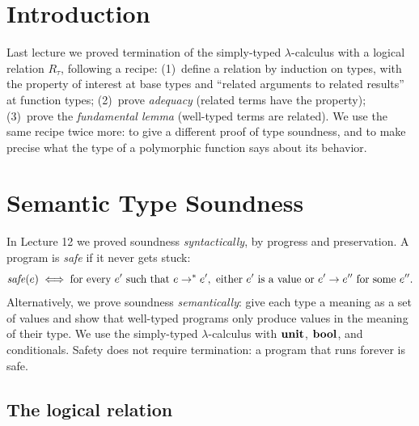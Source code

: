 %  
\section{Introduction}
 
Last lecture we proved termination of the simply-typed $\lambda$-calculus with a
logical relation $R_\tau$, following a recipe: (1)~define a relation by induction on
types, with the property of interest at base types and ``related arguments to related
results'' at function types; (2)~prove \emph{adequacy} (related terms have the
property); (3)~prove the \emph{fundamental lemma} (well-typed terms are related). We
use the same recipe twice more: to give a different proof of type soundness, and to
make precise what the type of a polymorphic function says about its behavior.
 
\section{Semantic Type Soundness}
 
In Lecture 12 we proved soundness \emph{syntactically}, by progress and preservation.
A program is \emph{safe} if it never gets stuck:
\[
\mathit{safe}(e) \iff \text{for every } e' \text{ such that } e \to^* e', \text{ either } e' \text{ is a value or } e' \to e'' \text{ for some } e''.
\]
Alternatively, we prove soundness \emph{semantically}: give each type a meaning as a
set of values and show that well-typed programs only produce values in the meaning of
their type. We use the simply-typed $\lambda$-calculus with $\mathbf{unit}$, $\mathbf{bool}$,
and conditionals. Safety does not require termination: a program that runs forever is
safe.
 
\subsection{The logical relation}
 
